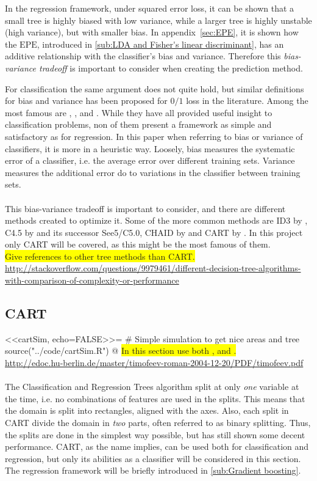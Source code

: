 In the regression framework, under squared error loss, it can be shown that a small tree is highly biased with low variance, while a larger tree is highly unstable (high variance), but with smaller bias. 
In appendix~\ref{sec:EPE}, it is shown how the $\mathrm{EPE}$, introduced in \ref{sub:LDA and Fisher's linear discriminant}, has an additive relationship with the classifier's bias and variance. Therefore this \textit{bias-variance tradeoff} is important to consider when creating the prediction method. 

For classification the same argument does not quite hold, but similar definitions for bias and variance has been proposed for $0/1$ loss in the literature. Among the most famous are \cite{kong1995error}, \cite{kohavi1996bias}, \cite{breiman1996bias} and \cite{Friedman1997bias}. While they have all provided useful insight to classification problems, non of them present a framework as simple and satisfactory as for regression. In this paper when referring to bias or variance of classifiers, it is more in a heuristic way. Loosely, bias measures the systematic error of a classifier, i.e. the average error over different training sets. Variance measures the additional error do to variations in the classifier between training sets. 
\\
\\
This bias-variance tradeoff is important to consider, and there are different methods created to optimize it.
Some of the more common methods are ID3 by \cite{ID3}, C4.5 by \cite{C4.5} and its successor See5/C5.0, CHAID by \cite{CHAID} and CART by \cite{breiman}.
In this project only CART will be covered, as this might be the most famous of them.
\\ \colorbox{yellow}{Give references to other tree methods than CART.}
\\\url{http://stackoverflow.com/questions/9979461/different-decision-tree-algorithms-with-comparison-of-complexity-or-performance}
%
\subsection{CART}
\label{subsub:CART}
<<cartSim, echo=FALSE>>=
# Simple simulation to get nice areas and tree
source("../code/cartSim.R")
@
\colorbox{yellow}{In this section use both \cite{bishop} , \cite{modstat} and \cite{breiman}.}\\
\url{http://edoc.hu-berlin.de/master/timofeev-roman-2004-12-20/PDF/timofeev.pdf}\\\\
%
The Classification and Regression Trees algorithm split at only \textit{one} variable at the time, i.e. no combinations of features are used in the splits. This means that the domain is split into rectangles, aligned with the axes. 
Also, each split in CART divide the domain in \textit{two} parts, often referred to as binary splitting. Thus, the splits are done in the simplest way possible, but has still shown some decent performance. CART, as the name implies, can be used both for classification and regression, but only its abilities as a classifier will be considered in this section. The regression framework will be briefly introduced in \ref{sub:Gradient boosting}.

